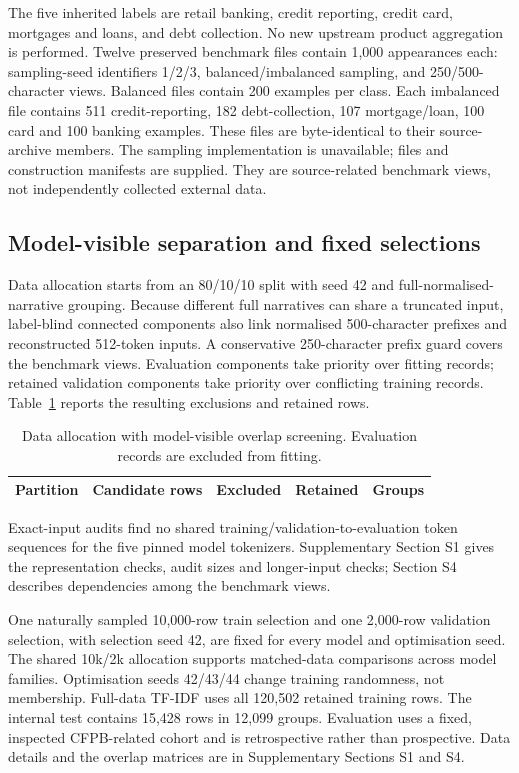 \documentclass{elektr}
\begin{document}
The five inherited labels are retail banking, credit reporting, credit card, mortgages and loans, and debt collection. No new upstream product aggregation is performed. Twelve preserved benchmark files contain 1,000 appearances each: sampling-seed identifiers 1/2/3, balanced/imbalanced sampling, and 250/500-character views. Balanced files contain 200 examples per class. Each imbalanced file contains 511 credit-reporting, 182 debt-collection, 107 mortgage/loan, 100 card and 100 banking examples. These files are byte-identical to their source-archive members. The sampling implementation is unavailable; files and construction manifests are supplied. They are source-related benchmark views, not independently collected external data.

\subsection{Model-visible separation and fixed selections}
\label{sec:revised-data}
Data allocation starts from an 80/10/10 split with seed 42 and full-normalised-narrative grouping. Because different full narratives can share a truncated input, label-blind connected components also link normalised 500-character prefixes and reconstructed 512-token inputs. A conservative 250-character prefix guard covers the benchmark views. Evaluation components take priority over fitting records; retained validation components take priority over conflicting training records. Table~\ref{tab:data-flow} reports the resulting exclusions and retained rows.
\begin{table}[htbp]
\caption{Data allocation with model-visible overlap screening. Evaluation records are excluded from fitting.}
\label{tab:data-flow}\centering\small
\begin{tabular}{lrrrr}\hline
Partition & Candidate rows & Excluded & Retained & Groups\\\hline

\end{tabular}
\end{table}

Exact-input audits find no shared training/validation-to-evaluation token sequences for the five pinned model tokenizers. Supplementary Section S1 gives the representation checks, audit sizes and longer-input checks; Section S4 describes dependencies among the benchmark views.

One naturally sampled 10,000-row train selection and one 2,000-row validation selection, with selection seed 42, are fixed for every model and optimisation seed. The shared 10k/2k allocation supports matched-data comparisons across model families. Optimisation seeds 42/43/44 change training randomness, not membership. Full-data TF-IDF uses all 120,502 retained training rows. The internal test contains 15,428 rows in 12,099 groups. Evaluation uses a fixed, inspected CFPB-related cohort and is retrospective rather than prospective. Data details and the overlap matrices are in Supplementary Sections S1 and S4.
\end{document}
